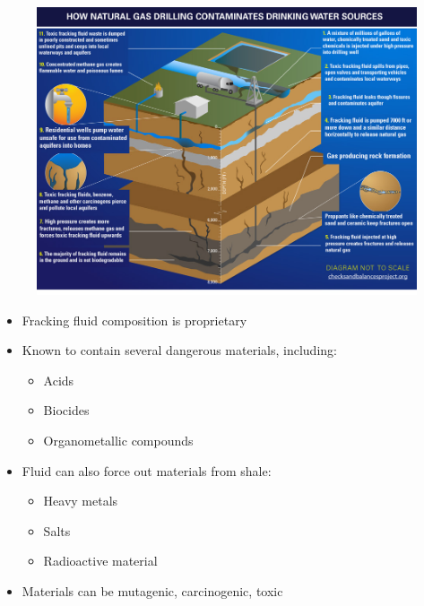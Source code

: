 \begin{frame}
\begin{figure}
		\includegraphics[scale=0.28]{contamination.jpg}
\end{figure}
\end{frame}
	
\begin{frame}
\begin{itemize}
	\item Fracking fluid composition is proprietary
	\item Known to contain several dangerous materials, including:
		\begin{itemize}
		\item Acids
		\item Biocides
		\item Organometallic compounds
		\end{itemize}
	\item Fluid can also force out materials from shale:
		\begin{itemize}
		\item Heavy metals
		\item Salts
		\item Radioactive material
		\end{itemize}
		
	\item Materials can be mutagenic, carcinogenic, toxic
\end{itemize}\end{frame}